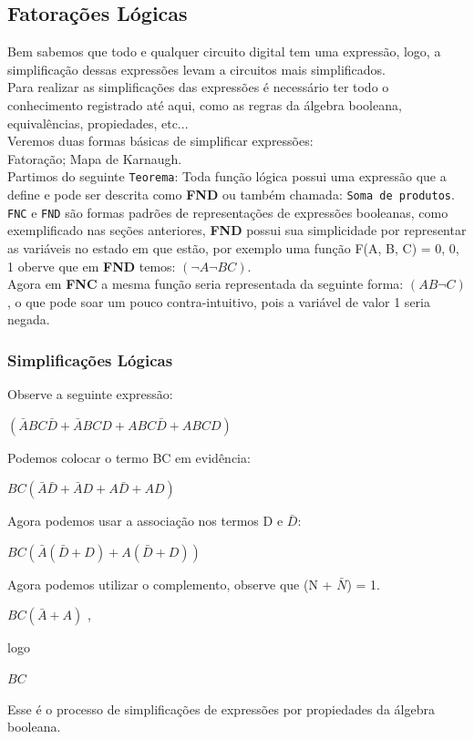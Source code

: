 \documentclass[12pt, onecolumn]{article}
\begin{document}
	\subsection{\centering Fatorações Lógicas}
	
	Bem sabemos que todo e qualquer circuito digital tem uma expressão, logo, 
	a simplificação dessas expressões levam a circuitos mais simplificados. \\
	\newline
	Para realizar as simplificações das expressões é necessário ter todo o
	conhecimento registrado até aqui, como as regras da álgebra booleana, 
	equivalências, propiedades, etc... \\
	\newline
	Veremos duas formas básicas de simplificar expressões: \\	
		Fatoração;
		Mapa de Karnaugh. \\
	\newline	
	Partimos do seguinte \texttt{Teorema}: Toda função lógica possui uma 
	expressão que a define e pode ser descrita como \textbf{FND} ou também 
	chamada: \texttt{Soma de produtos}. \\
	\newline
	\texttt{FNC} e \texttt{FND} são formas padrões de representações de 
	expressões booleanas, como exemplificado nas seções anteriores, 
	\textbf{FND} possui sua simplicidade por representar as variáveis no 
	estado em que estão, por exemplo uma função F(A, B, C) = 0, 0, 1 oberve 
	que em \textbf{FND} temos: $(\lnot{A} \lnot{B} C)$. \\
	\newline
	Agora em \textbf{FNC} a mesma função seria representada	da seguinte 
	forma: $(A B \lnot{C})$, o que pode soar um pouco contra-intuitivo,
	pois a variável de valor 1 seria negada.
		
	\subsubsection{\centering Simplificações Lógicas}
	
	Observe a seguinte expressão: 
	\begin{center} 
		$(\bar{A} B C\bar{D} + \bar{A} B C D + A B C\bar{D} + A B C D)$	
	\end{center}
	Podemos colocar o termo BC em evidência:
	\begin{center} 
		$BC(\bar{A}\bar{D} + \bar{A}D + A\bar{D} + AD)$
	\end{center}
	Agora podemos usar a associação nos termos D e $\bar{D}$: 
	\begin{center} 
		$BC(\bar{A}(\bar{D}  + D) + A(\bar{D} + D))$
	\end{center}
	Agora podemos utilizar o complemento, observe que (N + $\bar{N}$) = 1. \\
	\begin{center} 
		$BC(\bar{A} + A)$ ,  
	\end{center}
	logo \\
	\begin{center} 
		$BC$
	\end{center}
	Esse é o processo de simplificações de expressões por propiedades da álgebra 
	booleana. 
\end{document}
